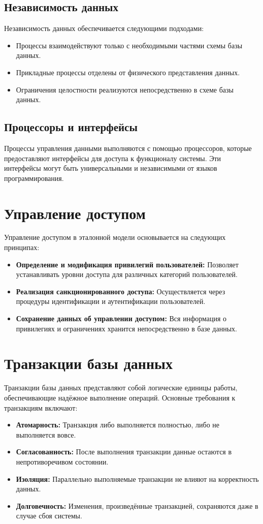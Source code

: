 \subsection*{Независимость данных}
Независимость данных обеспечивается следующими подходами:
\begin{itemize}
    \item Процессы взаимодействуют только с необходимыми частями схемы базы данных.
    \item Прикладные процессы отделены от физического представления данных.
    \item Ограничения целостности реализуются непосредственно в схеме базы данных.
\end{itemize}

\subsection*{Процессоры и интерфейсы}
Процессы управления данными выполняются с помощью процессоров, которые предоставляют интерфейсы для доступа к функционалу системы. Эти интерфейсы могут быть универсальными и независимыми от языков программирования.

\section*{Управление доступом}
Управление доступом в эталонной модели основывается на следующих принципах:
\begin{itemize}
    \item \textbf{Определение и модификация привилегий пользователей:} Позволяет устанавливать уровни доступа для различных категорий пользователей.
    \item \textbf{Реализация санкционированного доступа:} Осуществляется через процедуры идентификации и аутентификации пользователей.
    \item \textbf{Сохранение данных об управлении доступом:} Вся информация о привилегиях и ограничениях хранится непосредственно в базе данных.
\end{itemize}

\section*{Транзакции базы данных}
Транзакции базы данных представляют собой логические единицы работы, обеспечивающие надёжное выполнение операций. Основные требования к транзакциям включают:
\begin{itemize}
    \item \textbf{Атомарность:} Транзакция либо выполняется полностью, либо не выполняется вовсе.
    \item \textbf{Согласованность:} После выполнения транзакции данные остаются в непротиворечивом состоянии.
    \item \textbf{Изоляция:} Параллельно выполняемые транзакции не влияют на корректность данных.
    \item \textbf{Долговечность:} Изменения, произведённые транзакцией, сохраняются даже в случае сбоя системы.
\end{itemize}


